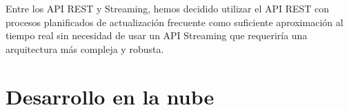 Entre los API REST y Streaming, hemos decidido utilizar el API REST con procesos planificados de actualización frecuente 
como suficiente aproximación al tiempo real sin necesidad de usar un API Streaming que requeriría una arquitectura más compleja y robusta. 





\section{Desarrollo en la nube}